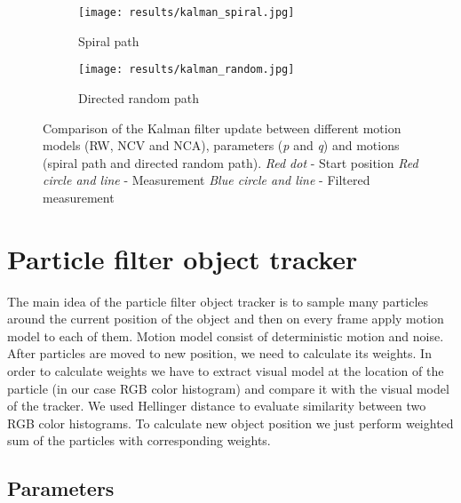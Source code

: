 \documentclass[runningheads]{llncs}
\begin{document}
\begin{figure}
    \centering

    \begin{subfigure}{\textwidth}
        \centering
        \texttt{[image: results/kalman\_spiral.jpg]}
        \caption{Spiral path}
    \end{subfigure}
    
    \begin{subfigure}{\textwidth}
        \centering
        \texttt{[image: results/kalman\_random.jpg]}
        \caption{Directed random path}
    \end{subfigure}
    
    \caption{Comparison of the Kalman filter update between different motion models (RW, NCV and NCA), parameters (\textit{p} and \textit{q}) and motions (spiral path and directed random path).
    \newline
    \newline\textit{Red dot} - Start position
    \newline\textit{Red circle and line} - Measurement
    \newline\textit{Blue circle and line} - Filtered measurement}
    \label{img_kalman_filter_comparison}
\end{figure}

\newpage

\section{Particle filter object tracker}

The main idea of the particle filter object tracker is to sample many particles around the current position of the object and then on every frame apply motion model to each of them. Motion model consist of deterministic motion and noise. After particles are moved to new position, we need to calculate its weights. In order to calculate weights we have to extract visual model at the location of the particle (in our case RGB color histogram) and compare it with the visual model of the tracker. We used Hellinger distance to evaluate similarity between two RGB color histograms. To calculate new object position we just perform weighted sum of the particles with corresponding weights.

\subsection{Parameters}
\end{document}
